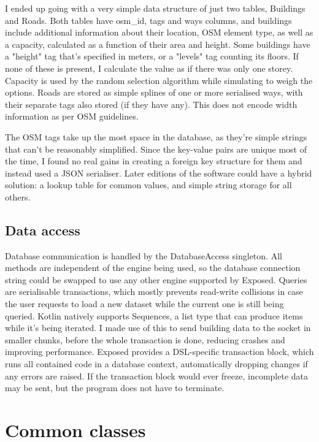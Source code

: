 I ended up going with a very simple data structure of just two tables, Buildings and Roads. Both tables have osm\_id, tags and ways columns, and buildings include additional information about their location, OSM element type, as well as a capacity, calculated as a function of their area and height. Some buildings have a "height" tag that's specified in meters, or a "levels" tag counting its floors. If none of these is present, I calculate the value as if there was only one storey. Capacity is used by the random selection algorithm while simulating to weigh the options. Roads are stored as simple splines of one or more serialised ways, with their separate tags also stored (if they have any). This does not encode width information as per OSM guidelines.

The OSM tags take up the most space in the database, as they're simple strings that can't be reasonably simplified. Since the key-value pairs are unique most of the time, I found no real gains in creating a foreign key structure for them and instead used a JSON serialiser. Later editions of the software could have a hybrid solution: a lookup table for common values, and simple string storage for all others.

\subsection{Data access}

Database communication is handled by the DatabaseAccess singleton. All methods are independent of the engine being used, so the database connection string could be swapped to use any other engine supported by Exposed. Queries are serialisable transactions, which mostly prevents read-write collisions in case the user requests to load a new dataset while the current one is still being queried. Kotlin natively supports Sequences, a list type that can produce items while it's being iterated. I made use of this to send building data to the socket in smaller chunks, before the whole transaction is done, reducing crashes and improving performance. Exposed provides a DSL-specific transaction block, which runs all contained code in a database context, automatically dropping changes if any errors are raised. If the transaction block would ever freeze, incomplete data may be sent, but the program does not have to terminate.

\section{Common classes}

